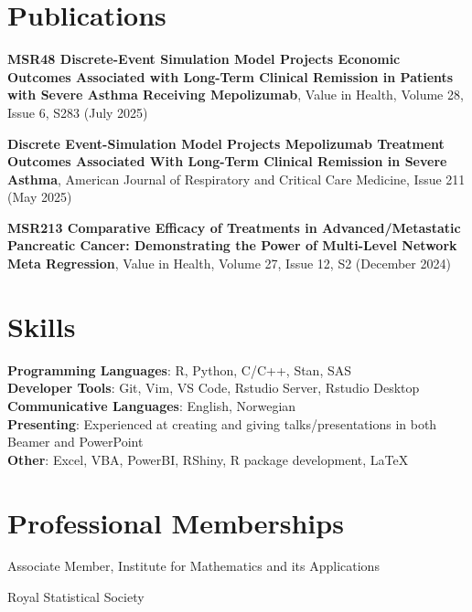 \documentclass[letterpaper,11pt]{article}
\begin{document}
\section{Publications}
\begin{itemize}[leftmargin=0.15in, label={}]
    \small{
\item{\textbf{MSR48 Discrete-Event Simulation Model Projects Economic Outcomes Associated with Long-Term Clinical Remission in Patients with Severe Asthma Receiving Mepolizumab}, Value in Health, Volume 28, Issue 6, S283 (July 2025)}

\item{\textbf{Discrete Event-Simulation Model Projects Mepolizumab Treatment Outcomes Associated With Long-Term Clinical Remission in Severe Asthma}, American Journal of Respiratory and Critical Care Medicine, Issue 211 (May 2025)}

\item{\textbf{MSR213 Comparative Efficacy of Treatments in Advanced/Metastatic Pancreatic Cancer: Demonstrating the Power of Multi-Level Network Meta Regression}, Value in Health, Volume 27, Issue 12, S2 (December 2024)}}
\end{itemize}

\section{Skills}
 \begin{itemize}[leftmargin=0.15in, label={}]
    \small{\item{
     \textbf{Programming Languages}{: R, Python, C/C++, Stan, SAS} \\
     \textbf{Developer Tools}{: Git, Vim,  VS Code, Rstudio Server, Rstudio Desktop} \\
     \textbf{Communicative Languages}: English, Norwegian \\
     \textbf{Presenting}{: Experienced at creating and giving talks/presentations in both Beamer and PowerPoint} \\
    \textbf{Other}{: Excel, VBA, PowerBI, RShiny, R package development, \LaTeX}
    }}
\end{itemize}

\section{Professional Memberships}
\begin{itemize}[leftmargin=0.15in, label={}]
    \small{\item{Associate Member, Institute for Mathematics and its Applications \\
           \item Royal Statistical Society}}
\end{itemize}
\end{document}
